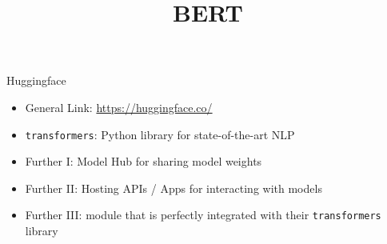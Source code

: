 



\newcommand{\titlefigure}{figure/bert.jpeg}
\newcommand{\learninggoals}{
\item defined the key learning goals here
\item second learning goal}

\title{BERT}
\date{}




\begin{frame}{Huggingface}

\vfill

	\begin{itemize}
		\item General Link: \url{https://huggingface.co/}
		\item \texttt{transformers}: Python library for state-of-the-art NLP \\
		\item Further I: Model Hub for sharing model weights\\
		\item Further II: Hosting APIs / Apps for interacting with models\\
		\item Further III:  module that is perfectly integrated with their \texttt{transformers} library
	\end{itemize}

\vfill

\end{frame}


